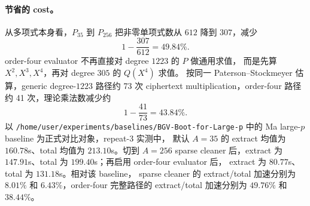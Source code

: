 \paragraph{节省的 cost。}
从多项式本身看，\(P_{35}\) 到 \(P_{256}\) 把非零单项式数从 \(612\)
降到 \(307\)，减少
\[
  1-\frac{307}{612}=49.84\%.
\]
order-four evaluator 不再直接对 degree \(1223\) 的 \(P\) 做通用求值，
而是先算 \(X^2,X^3,X^4\)，再对 degree \(305\) 的 \(Q(X^4)\) 求值。
按同一 Paterson--Stockmeyer 估算，generic degree-\(1223\) 路径约
73 次 ciphertext multiplication，order-four 路径约
41 次，理论乘法数减少约
\[
  1-\frac{41}{73}
  =43.84\%.
\]
以 \texttt{/home/user/experiments/baselines/BGV-Boot-for-Large-p}
中的 Ma large-\(p\) baseline 为正式对比对象，repeat-3 实测中，
默认 \(A=35\) 的 extract 均值为 \(160.78\)s、total 均值为
\(213.10\)s。切到 \(A=256\) sparse cleaner 后，extract 为
\(147.91\)s、total 为 \(199.40\)s；再启用 order-four evaluator 后，
extract 为 \(80.77\)s、total 为 \(131.18\)s。相对该 baseline，
sparse cleaner 的 extract/total 加速分别为 \(8.01\%\) 和
\(6.43\%\)，order-four 完整路径的 extract/total 加速分别为
\(49.76\%\) 和 \(38.44\%\)。


